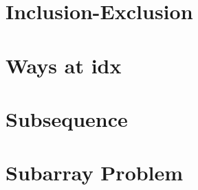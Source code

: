 \part{Inclusion-Exclusion}



\part{Ways at idx}


\part{Subsequence}






\part{Subarray Problem}





